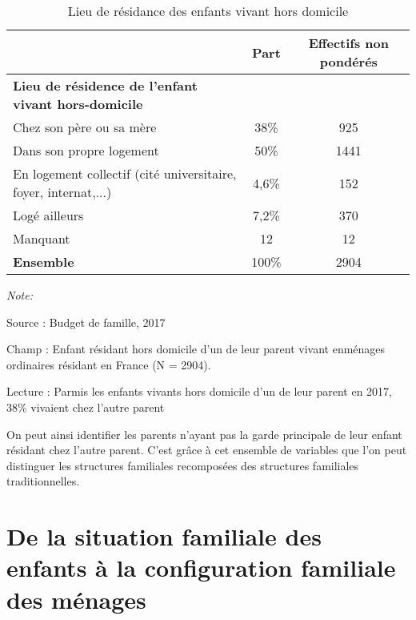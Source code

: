 \documentclass[
  12pt,
]{book}
\begin{document}
\begin{table}[!h]
\centering\centering
\caption{\label{tab:ENFANTSHD}Lieu de résidance des enfants vivant hors domicile}
\centering
\fontsize{8}{10}\selectfont
\begin{threeparttable}
\begin{tabular}[t]{lcc}
\toprule
 & \textbf{Part} & \textbf{Effectifs non pondérés}\\
\midrule
\textbf{Lieu de résidence de l'enfant vivant hors-domicile} &  & \\
\hspace{1em}Chez son père ou sa mère & 38\% & 925\\
\hspace{1em}Dans son propre logement & 50\% & 1441\\
\hspace{1em}En logement collectif (cité universitaire, foyer, internat,...) & 4,6\% & 152\\
\hspace{1em}Logé ailleurs & 7,2\% & 370\\
\addlinespace
\hspace{1em}Manquant & 12 & 12\\
\textbf{Ensemble} & 100\% & 2904\\
\bottomrule
\end{tabular}
\begin{tablenotes}
\item \textit{Note: } 
\item Source : Budget de famille, 2017
\item Champ : Enfant résidant hors domicile d'un de leur parent vivant enménages ordinaires résidant en France (N = 2904).
\item Lecture : Parmis les enfants vivants hors domicile d'un de leur parent en 2017, 38\% vivaient chez l'autre parent
\end{tablenotes}
\end{threeparttable}
\end{table}

On peut ainsi identifier les parents n'ayant pas la garde principale de
leur enfant résidant chez l'autre parent. C'est grâce à cet ensemble de
variables que l'on peut distinguer les structures familiales recomposées
des structures familiales traditionnelles.

\section{De la situation familiale des enfants à la configuration
familiale des
ménages}\label{de-la-situation-familiale-des-enfants-uxe0-la-configuration-familiale-des-muxe9nages}
\end{document}
